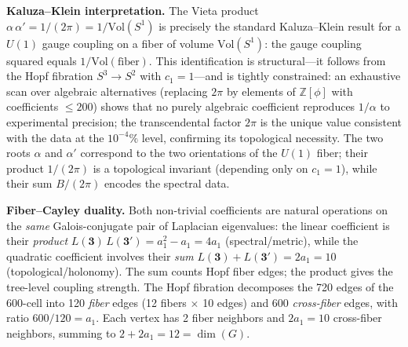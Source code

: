 \documentclass[12pt,a4paper]{article}
\theoremstyle{definition}
\begin{document}
\textbf{Kaluza--Klein interpretation.}  The Vieta product $\alpha\,\alpha' = 1/(2\pi) = 1/\mathrm{Vol}(S^1)$ is precisely the standard Kaluza--Klein result for a $U(1)$ gauge coupling on a fiber of volume $\mathrm{Vol}(S^1)$: the gauge coupling squared equals $1/\mathrm{Vol}(\text{fiber})$.  This identification is structural---it follows from the Hopf fibration $S^3 \to S^2$ with $c_1 = 1$---and is tightly constrained: an exhaustive scan over algebraic alternatives (replacing $2\pi$ by elements of $\mathbb{Z}[\phi]$ with coefficients $\leq 200$) shows that no purely algebraic coefficient reproduces $1/\alpha$ to experimental precision; the transcendental factor $2\pi$ is the unique value consistent with the data at the $10^{-4}\%$ level, confirming its topological necessity.  The two roots $\alpha$ and $\alpha'$ correspond to the two orientations of the $U(1)$ fiber; their product $1/(2\pi)$ is a topological invariant (depending only on $c_1 = 1$), while their sum $B/(2\pi)$ encodes the spectral data.

\textbf{Fiber--Cayley duality.}  Both non-trivial coefficients are natural operations on the \emph{same} Galois-conjugate pair of Laplacian eigenvalues: the linear coefficient is their \emph{product} $L(\mathbf{3})\,L(\mathbf{3'}) = a_1^2 - a_1 = 4a_1$ (spectral/metric), while the quadratic coefficient involves their \emph{sum} $L(\mathbf{3}) + L(\mathbf{3'}) = 2a_1 = 10$ (topological/holonomy).  The sum counts Hopf fiber edges; the product gives the tree-level coupling strength.  The Hopf fibration decomposes the 720 edges of the 600-cell into 120 \emph{fiber} edges (12 fibers $\times$ 10 edges) and 600 \emph{cross-fiber} edges, with ratio $600/120 = a_1$.  Each vertex has 2 fiber neighbors and $2a_1 = 10$ cross-fiber neighbors, summing to $2 + 2a_1 = 12 = \dim(G)$.
\end{document}
